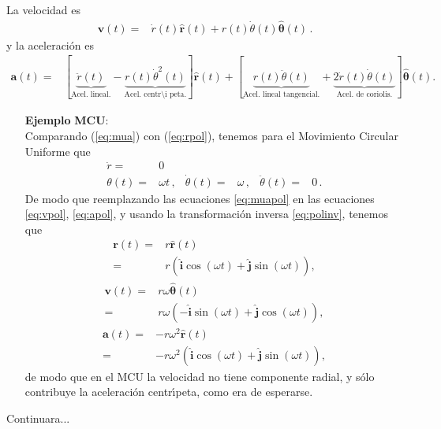 La velocidad es
\begin{align}
  \label{eq:vpol}
  \mathbf{v}(t)=&%
  \dot{r}(t)\hat{\mathbf{r}}(t)+r(t)\dot{\theta}(t)\hat{\boldsymbol{\theta}}(t)\,.
\end{align}
y la aceleraci\'on es
\begin{align}
\label{eq:apol}
  \mathbf{a}(t)=&%
[\underbrace{\ddot{r}(t)}_{{\text{Acel. lineal.}}}
-\underbrace{r(t)\dot{\theta}^2(t)}_{{\text{Acel. centr\'\i peta.}}}]\hat{\mathbf{r}}(t)
+[\underbrace{r(t)\ddot{\theta}(t)}_{{\text{Acel. lineal tangencial.}}}
+\underbrace{2\dot{r}(t)\dot{\theta}(t)}_{{\text{Acel. de coriolis.}}}]\hat{\boldsymbol{\theta}}(t).
\end{align}
\begin{itemize}
\item[\textbf{Ejemplo}] \textbf{MCU}:\\
Comparando (\ref{eq:mua}) con (\ref{eq:rpol}), tenemos para el Movimiento Circular Uniforme que
\begin{align}
  \label{eq:muapol}
   \dot{r}=&0&&&&\\
  \theta(t)=&\omega t\,,&\dot{\theta}(t)=&\omega\,,&\ddot{\theta}(t)=&0\,.
\end{align}
De modo que reemplazando las ecuaciones \eqref{eq:muapol} en las ecuaciones \eqref{eq:vpol}, \eqref{eq:apol}, y usando la transformaci\'on inversa \eqref{eq:polinv}, tenemos que
\begin{align}
  \mathbf{r}(t)=&r\hat{\mathbf{r}}(t)\nonumber\\
  =&r\left(\hat{\mathbf{i}}\cos(\omega t)+\hat{\mathbf{j}}\sin(\omega t)\right),
\end{align}
\begin{align}
    \mathbf{v}(t)=&r\omega\hat{\boldsymbol{\theta}}(t)\nonumber\\
    =&r\omega\left(-\hat{\mathbf{i}}\sin(\omega t)+\hat{\mathbf{j}}\cos(\omega t)\right),
\end{align}
\begin{align}
  \mathbf{a}(t)=&-r\omega^2\hat{\mathbf{r}}(t)\nonumber\\
  =&-r\omega^2\left(\hat{\mathbf{i}}\cos(\omega t)+\hat{\mathbf{j}}\sin(\omega t)\right),
\end{align}
de modo que en el MCU la velocidad no tiene componente radial, y s\'olo
contribuye la aceleraci\'on centr\'\i peta, como era de esperarse.
\end{itemize}

Continuara...








